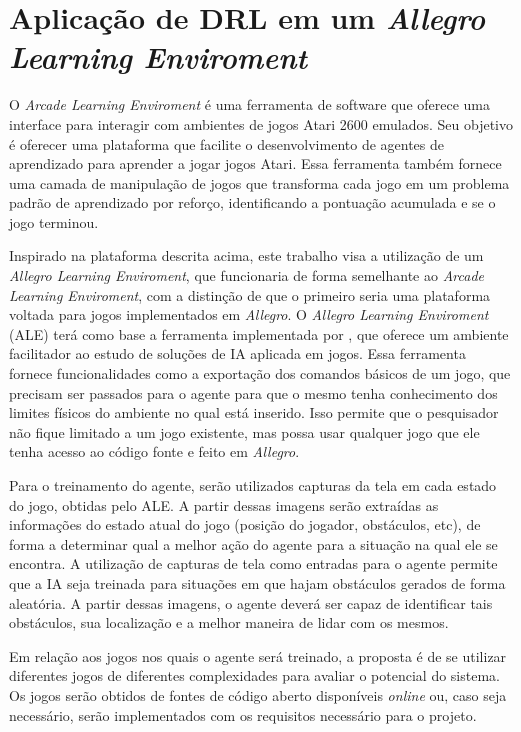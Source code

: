 \section{Aplicação de DRL em um \textit{Allegro Learning Enviroment}} %
 \label{sec:allegro_learning_enviroment}

 O \textit{Arcade Learning Enviroment} é uma ferramenta de software que oferece uma interface para interagir com ambientes de jogos Atari 2600 emulados. Seu objetivo é oferecer uma plataforma que facilite o desenvolvimento de agentes de aprendizado para aprender a jogar jogos Atari. Essa ferramenta também fornece uma camada de manipulação de jogos que
 transforma cada jogo em um problema padrão de aprendizado por reforço, identificando a pontuação acumulada e se o jogo terminou. \cite{arcade-learning-enviroment}

 Inspirado na plataforma descrita acima, este trabalho visa a utilização de um \textit{Allegro Learning Enviroment}, que funcionaria de forma semelhante ao \textit{Arcade Learning Enviroment}, com a distinção de que o primeiro seria uma plataforma voltada para jogos implementados em \textit{Allegro}. O \textit{Allegro Learning Enviroment} (ALE) terá como base a ferramenta implementada por \cite{silva:amb-jd-allegro}, que oferece um ambiente facilitador ao estudo de soluções de IA aplicada em jogos. Essa ferramenta fornece funcionalidades como a exportação dos comandos básicos de um jogo, que precisam ser passados para o agente para que o mesmo tenha conhecimento dos limites físicos do ambiente no qual está inserido. Isso permite que o pesquisador não fique limitado a um jogo existente, mas possa usar qualquer jogo que ele tenha acesso ao código fonte e feito em \textit{Allegro}.

 Para o treinamento do agente, serão utilizados capturas da tela em cada estado do jogo, obtidas pelo ALE. A partir dessas imagens serão extraídas  as informações do estado atual do jogo (posição do jogador, obstáculos, etc), de forma a determinar qual a melhor ação do agente para a situação na qual ele se encontra. A utilização de capturas de tela como entradas para o agente permite que a IA seja treinada para situações em que hajam obstáculos gerados de forma aleatória. A partir dessas imagens, o agente deverá ser capaz de identificar tais obstáculos, sua localização e a melhor maneira de lidar com os mesmos.

 Em relação aos jogos nos quais o agente será treinado, a proposta é de se utilizar diferentes jogos de diferentes complexidades para avaliar o potencial do sistema. Os jogos serão obtidos de fontes de código aberto disponíveis \textit{online} ou, caso seja necessário, serão implementados com os requisitos necessário para o projeto.



 



 




